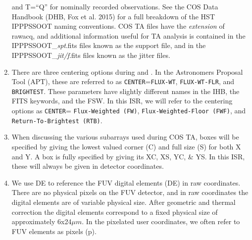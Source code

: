 \begin{enumerate}
{\begin{itemize}
{			and T=``Q'' for nominally recorded observations. See the COS Data Handbook (DHB, Fox et al. 2015) for a full breakdown of the HST IPPPSSOOT naming conventions.
			COS TA files have the {\it extension} of {\sf rawacq}, and additional
			information useful for TA analysis is contained in the {\sf IPPPSSOOT\_{\it spt}.fits} files known as the support file,
			and in the {\sf IPPPSSOOT\_{\it jit/f}.fits} files known as the jitter files.
			}
		\end{itemize}
	}
	\item{There are three centering options during  and . In the Astronomers Proposal Tool (APT), these are
		referred to as \texttt{CENTER}=\texttt{FLUX-WT}, \texttt{FLUX-WT-FLR}, and \texttt{BRIGHTEST}.
		These parameters have slightly different names in the IHB, the FITS keywords, and the FSW.
		In this ISR, we will refer to the centering options as \texttt{CENTER}= \texttt{Flux-Weighted (FW)},
		\texttt{Flux-Weighted-Floor (FWF)}, and \texttt{Return-To-Brightest (RTB)}.
	}
	\item{When discussing the various subarrays used during COS TA, boxes will be specified by giving the lowest
		valued corner (C) and full size (S) for both X and Y. A box is fully specified by
		giving its XC, XS, YC, \& YS. In this ISR, these will always be given in detector coordinates.}
	\item{We use DE to reference the FUV digital elements (DE) in raw coordinates. There are no physical pixels on the FUV detector, and in raw coordinates the digital elements are of variable physical size. After geometric and thermal correction the digital elements correspond to a fixed physical size of approximately 6x24$\mu m$. In the pixelated user coordinates, we often refer to FUV elements as pixels (p). }

\end{enumerate}
